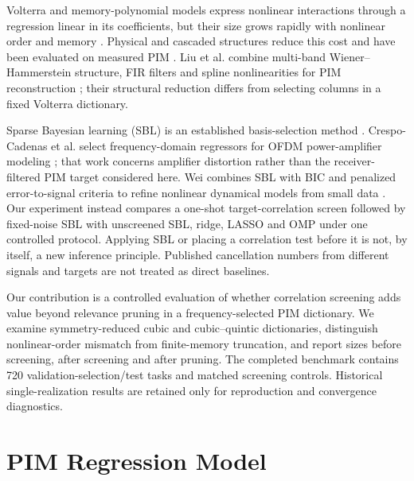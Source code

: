 \documentclass[conference]{IEEEtran}
\begin{document}
Volterra and memory-polynomial models express nonlinear interactions through a regression linear in its coefficients, but their size grows rapidly with nonlinear order and memory \cite{Schetzen1980Volterra,Morgan2006GMP,Waheed2020PIM}. Physical and cascaded structures reduce this cost and have been evaluated on measured PIM \cite{Lampu2023Algorithms,Lampu2023Cascade}. Liu et al. combine multi-band Wiener--Hammerstein structure, FIR filters and spline nonlinearities for PIM reconstruction \cite{Liu2024MultiBand}; their structural reduction differs from selecting columns in a fixed Volterra dictionary.

Sparse Bayesian learning (SBL) is an established basis-selection method \cite{Tipping2001SBL,Wipf2004SBL}. Crespo-Cadenas et al. select frequency-domain regressors for OFDM power-amplifier modeling \cite{Crespo2025SparseRF}; that work concerns amplifier distortion rather than the receiver-filtered PIM target considered here. Wei combines SBL with BIC and penalized error-to-signal criteria to refine nonlinear dynamical models from small data \cite{Wei2025Identification}. Our experiment instead compares a one-shot target-correlation screen followed by fixed-noise SBL with unscreened SBL, ridge, LASSO and OMP under one controlled protocol. Applying SBL or placing a correlation test before it is not, by itself, a new inference principle. Published cancellation numbers from different signals and targets are not treated as direct baselines.

Our contribution is a controlled evaluation of whether correlation screening adds value beyond relevance pruning in a frequency-selected PIM dictionary. We examine symmetry-reduced cubic and cubic--quintic dictionaries, distinguish nonlinear-order mismatch from finite-memory truncation, and report sizes before screening, after screening and after pruning. The completed benchmark contains 720 validation-selection/test tasks and matched screening controls. Historical single-realization results are retained only for reproduction and convergence diagnostics.

\section{PIM Regression Model}
\label{sec:model}
\end{document}
